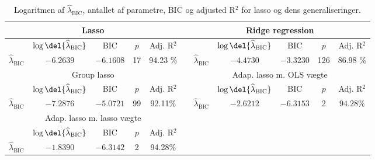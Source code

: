 
\begin{table}
\center
\begin{tabular}{lcccc  | lccccc} 
\toprule
 \multicolumn{5}{c}{Lasso} && \multicolumn{5}{c}{Ridge regression}  \\ \midrule
& $\log \del{\widehat{\lambda}_\text{BIC}}$  & BIC & $p$ & Adj. R$^2$ && & $\log \del{\widehat{\lambda}_\text{BIC}}$  &  BIC & $p$ & Adj. R$^2$  \\
$\widehat{\lambda}_\text{BIC} $&  $-6.2639$ & $-6.1608$ & 17 &  94.23 \% && $\widehat{\lambda}_\text{BIC} $ & $-4.4730$ & $-3.3230$ &  126 & 86.98 \% \\ \bottomrule \toprule 
 \multicolumn{5}{c}{Group lasso} && \multicolumn{5}{c}{Adap. lasso m. OLS vægte}  \\ \midrule
& $\log \del{\widehat{\lambda}_\text{BIC}}$  & BIC & $p$ & Adj. R$^2$ && & $\log \del{\widehat{\lambda}_\text{BIC}}$  &  BIC & $p$ & Adj. R$^2$   \\
$\widehat{\lambda}_\text{BIC}$ & $-7.2876$ &  $-5.0721$ &99  & 92.11\% &&  $\widehat{\lambda}_\text{BIC}$ & $-2.6212$ &  $-6.3153$  & 2 & $94.28 \%$ \\ \bottomrule \toprule 
 \multicolumn{5}{c}{Adap. lasso m. lasso vægte}  \\
& $\log \del{\widehat{\lambda}_\text{BIC}}$  & BIC & $p$ & Adj. R$^2$\\
 $\widehat{\lambda}_\text{BIC}  $&  	$-1.8390$ & $-6.3142$  & 2& 94.28\% \\ \cmidrule{1-5}
 \end{tabular}
\caption{Logaritmen af $\widehat{\lambda}_\text{BIC}$, antallet af parametre, BIC og adjusted R$^2$ for lasso og dens generaliseringer.} \label{tab:bic_lambda}
\end{table}